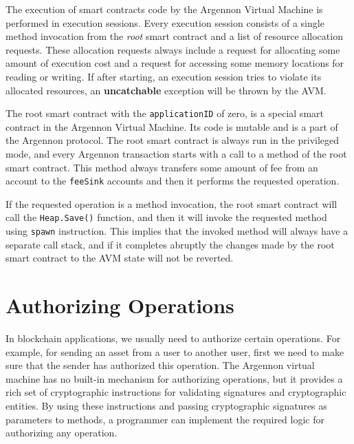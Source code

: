 The execution of smart contracts code by the Argennon Virtual Machine is performed in execution sessions. Every
execution session consists of a single method invocation from the \emph{root} smart contract and a list
of resource allocation requests. These allocation requests always include a request for allocating some amount
of execution cost and a request for accessing some memory locations for reading or writing. If after starting,
an execution session tries to violate its allocated resources, an \textbf{uncatchable} exception will
be thrown by the AVM\@.


The root smart contract with the \texttt{applicationID} of zero, is a special smart contract in the Argennon
Virtual Machine. Its code is mutable and is a part of the Argennon protocol. The root smart contract is always
run in the privileged mode, and every Argennon transaction starts with a call to a method of the root smart contract.
This method always transfers some amount of fee from an account to the \texttt{feeSink} accounts and then it
performs the requested operation.

If the requested operation is a method invocation, the root smart contract will call the \texttt{Heap.Save()}
function, and then it will invoke the requested method using \texttt{spawn} instruction. This implies that the
invoked method will always have a separate call stack, and if it completes abruptly the changes made by the root
smart contract to the AVM state will not be reverted.



\section{Authorizing Operations}\label{sec:authorizing-operations}

In blockchain applications, we usually need to authorize certain operations. For example, for sending an asset
from a user to another user, first we need to make sure that the sender has authorized this operation. The
Argennon virtual machine has no built-in mechanism for authorizing operations, but it provides a rich set of
cryptographic instructions for validating signatures and cryptographic entities. By using these instructions and
passing cryptographic signatures as parameters to methods, a programmer can implement the required logic
for authorizing any operation.

